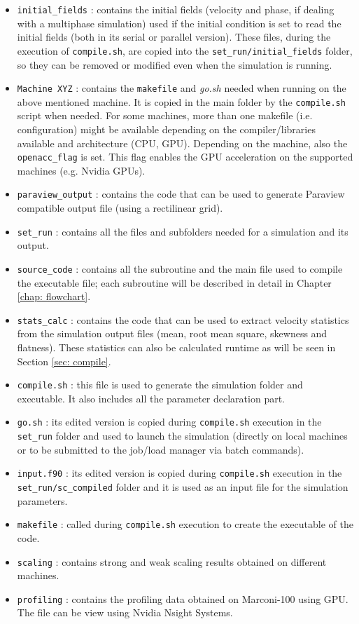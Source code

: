 \begin{itemize}
\item \texttt{initial\_fields} : contains the initial fields (velocity and phase, if dealing with a multiphase simulation) used if the initial condition is set to read the initial fields (both in its serial or parallel version). These files, during the execution of \texttt{compile.sh}, are copied into the \texttt{set\_run/initial\_fields} folder, so they can be removed or modified even when the simulation is running.
\item \texttt{Machine XYZ} : contains the \texttt{makefile} and \textit{go.sh} needed when running on the above mentioned machine. It is copied in the main folder by the \texttt{compile.sh} script when needed.
For some machines, more than one makefile (i.e. configuration) might be available depending on the compiler/libraries available and architecture (CPU, GPU).
Depending on the machine, also the \texttt{openacc\_flag} is set. 
This flag enables the GPU acceleration on the supported machines (e.g. Nvidia GPUs).
\item \texttt{paraview\_output} : contains the code that can be used to generate Paraview compatible output file (using a rectilinear grid).
\item \texttt{set\_run} : contains all the files and subfolders needed for a simulation and its output.
\item \texttt{source\_code} : contains all the subroutine and the main file used to compile the executable file; each subroutine will be described in detail in Chapter \ref{chap: flowchart}.
\item \texttt{stats\_calc} : contains the code that can be used to extract velocity statistics from the simulation output files (mean, root mean square, skewness and flatness). These statistics can also be calculated runtime as will be seen in Section \ref{sec: compile}.
\item \texttt{compile.sh} : this file is used to generate the simulation folder and executable. It also includes all the parameter declaration part.
\item \texttt{go.sh} : its edited version is copied during \texttt{compile.sh} execution in the \texttt{set\_run} folder and used to launch the simulation (directly on local machines or to be submitted to the job/load manager via batch commands).
\item \texttt{input.f90} : its edited version is copied during \texttt{compile.sh} execution in the \texttt{set\_run/sc\_compiled} folder and it is used as an input file for the simulation parameters.
\item \texttt{makefile} : called during \texttt{compile.sh} execution to create the executable of the code.
\item \texttt{scaling} : contains strong and weak scaling results obtained on different machines.
\item \texttt{profiling} : contains the profiling data obtained on Marconi-100 using GPU. The file can be view using Nvidia Nsight Systems.
\end{itemize}
